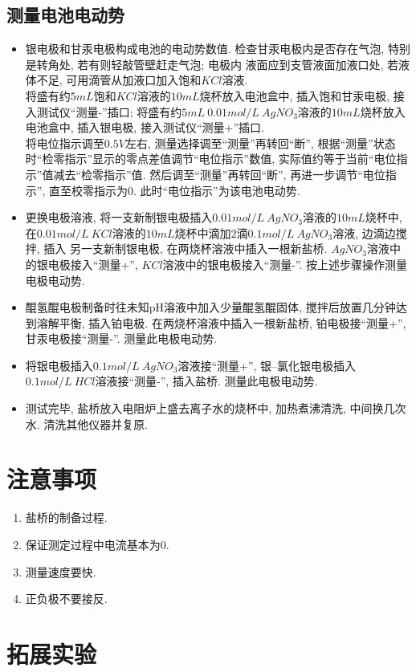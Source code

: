 \documentclass[a4paper]{article}
\begin{document}
\subsection{测量电池电动势}
\begin{itemize}
	\item 银电极和甘汞电极构成电池的电动势数值.
	检查甘汞电极内是否存在气泡, 特别是转角处, 若有则轻敲管壁赶走气泡; 电极内
	液面应到支管液面加液口处, 若液体不足, 可用滴管从加液口加入饱和$KCl$溶液.\\
	将盛有约$5mL$饱和$KCl$溶液的$10mL$烧杯放入电池盒中, 插入饱和甘汞电极, 接入测试仪``测量-''插口; 
	将盛有约$5mL~0.01mol/L~AgNO_{3}$溶液的$10mL$烧杯放入电池盒中, 插入银电极, 接入测试仪``测量+''插口. \\
	将电位指示调至$0.5V$左右, 测量选择调至``测量''再转回``断'', 
	根据``测量''状态时``检零指示''显示的零点差值调节``电位指示''数值, 实际值约等于当前``电位指示''值减去``检零指示''值.
	然后调至``测量''再转回``断'', 再进一步调节``电位指示'', 直至校零指示为0. 此时``电位指示''为该电池电动势.
	\item 更换电极溶液, 将一支新制银电极插入$0.01mol/L~AgNO_{3}$溶液的$10mL$烧杯中, 
	在$0.01mol/L~KCl$溶液的$10mL$烧杯中滴加$2$滴$0.1mol/L~AgNO_{3}$溶液, 边滴边搅拌, 插入
	另一支新制银电极, 在两烧杯溶液中插入一根新盐桥. $AgNO_{3}$溶液中的银电极接入``测量+'', 
	$KCl$溶液中的银电极接入``测量-''. 按上述步骤操作测量电极电动势. 
	\item 醌氢醌电极制备时往未知pH溶液中加入少量醌氢醌固体, 搅拌后放置几分钟达到溶解平衡, 
	插入铂电极. 在两烧杯溶液中插入一根新盐桥, 铂电极接``测量+'', 甘汞电极接``测量-''. 测量此电极电动势.
	\item 将银电极插入$0.1mol/L~AgNO_{3}$溶液接``测量+'', 银--氯化银电极插入$0.1mol/L~HCl$溶液接``测量-'', 
	插入盐桥. 测量此电极电动势.
	\item 测试完毕, 盐桥放入电阻炉上盛去离子水的烧杯中, 加热煮沸清洗, 中间换几次水. 
	清洗其他仪器并复原.
\end{itemize}
\section{注意事项}
\begin{enumerate}
	\item 盐桥的制备过程.
	\item 保证测定过程中电流基本为0.
	\item 测量速度要快.
	\item 正负极不要接反.
\end{enumerate}
\section{拓展实验}
\end{document}
